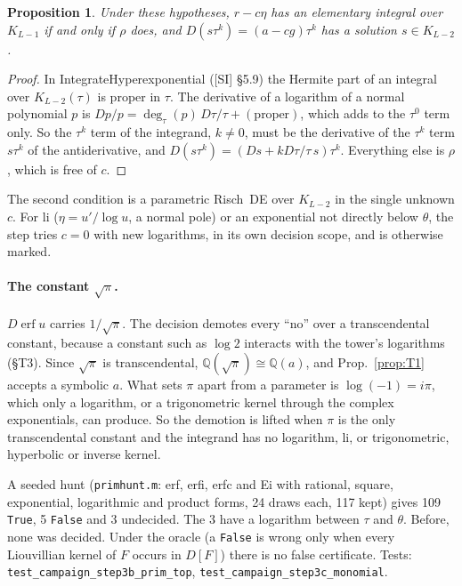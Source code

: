 \documentclass[11pt]{article}
\newtheorem{proposition}[theorem]{Proposition}
\theoremstyle{definition}
\theoremstyle{remark}
\newcommand{\Q}{\mathbb{Q}}
\newcommand{\code}[1]{\texttt{#1}}
\begin{document}
\begin{proposition}\label{prop:T12b}
Under these hypotheses, $r-c\eta$ has an elementary integral over $K_{L-1}$ if and only
if $\rho$ does, and $D(s\tau^k)=(a-cg)\tau^k$ has a solution $s\in K_{L-2}$.
\end{proposition}
\begin{proof}
In IntegrateHyperexponential ([SI] \S5.9) the Hermite part of an integral over
$K_{L-2}(\tau)$ is proper in $\tau$. The derivative of a logarithm of a normal
polynomial $p$ is $Dp/p=\deg_\tau(p)\,D\tau/\tau+(\text{proper})$, which adds to the
$\tau^0$ term only. So the $\tau^k$ term of the integrand, $k\ne0$, must be the
derivative of the $\tau^k$ term $s\tau^k$ of the antiderivative, and
$D(s\tau^k)=(Ds+kD\tau/\tau\,s)\tau^k$. Everything else is $\rho$, which is free of $c$.
\end{proof}
The second condition is a parametric Risch~DE over $K_{L-2}$ in the single unknown $c$.
For li ($\eta=u'/\log u$, a normal pole) or an exponential not directly below $\theta$,
the step tries $c=0$ with new logarithms, in its own decision scope, and is otherwise
marked.

\paragraph{The constant $\sqrt\pi$.} $D\operatorname{erf}u$ carries $1/\sqrt\pi$. The
decision demotes every ``no'' over a transcendental constant, because a constant such as
$\log2$ interacts with the tower's logarithms (\S T3). Since $\sqrt\pi$ is
transcendental, $\Q(\sqrt\pi)\cong\Q(a)$, and Prop.~\ref{prop:T1} accepts a symbolic
$a$. What sets $\pi$ apart from a parameter is $\log(-1)=i\pi$, which only a logarithm,
or a trigonometric kernel through the complex exponentials, can produce. So the demotion
is lifted when $\pi$ is the only transcendental constant and the integrand has no
logarithm, li, or trigonometric, hyperbolic or inverse kernel.

A seeded hunt (\code{primhunt.m}: erf, erfi, erfc and Ei with rational, square,
exponential, logarithmic and product forms, 24 draws each, 117 kept) gives 109
\code{True}, 5 \code{False} and 3 undecided. The 3 have a logarithm between $\tau$ and
$\theta$. Before, none was decided. Under the oracle (a \code{False} is wrong only when
every Liouvillian kernel of $F$ occurs in $D[F]$) there is no false certificate. Tests:
\code{test\_campaign\_step3b\_prim\_top}, \code{test\_campaign\_step3c\_monomial}.
\end{document}
